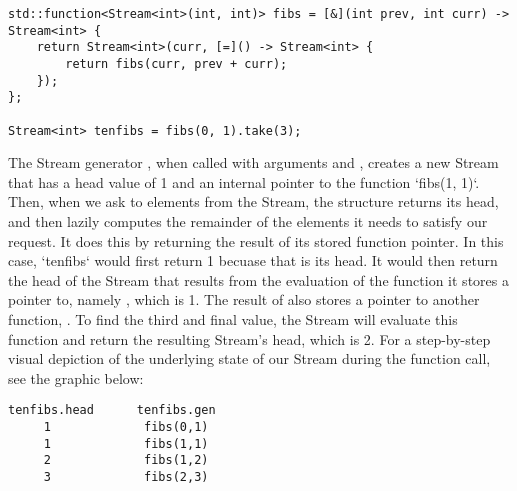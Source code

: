 \begin{lstlisting}
std::function<Stream<int>(int, int)> fibs = [&](int prev, int curr) -> Stream<int> {
    return Stream<int>(curr, [=]() -> Stream<int> {
        return fibs(curr, prev + curr);
    });
};

Stream<int> tenfibs = fibs(0, 1).take(3);
\end{lstlisting}

The Stream generator , when called with arguments  and , creates a new Stream that has a head value of 1 and an internal pointer to the function `fibs(1, 1)`.
Then, when we ask to  elements from the Stream, the structure returns its head, and then lazily computes the remainder of the elements it needs to satisfy our request.
It does this by returning the result of its stored function pointer.
In this case, `tenfibs` would first return 1 becuase that is its head.
It would then return the head of the Stream that results from the evaluation of the function it stores a pointer to, namely , which is 1.
The result of  also stores a pointer to another function, .
To find the third and final value, the Stream will evaluate this function and return the resulting Stream's head, which is 2.
For a step-by-step visual depiction of the underlying state of our Stream during the  function call, see the graphic below:

\begin{lstlisting}
tenfibs.head      tenfibs.gen
     1             fibs(0,1)
     1             fibs(1,1)
     2             fibs(1,2)
     3             fibs(2,3)
\end{lstlisting}

